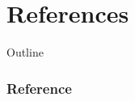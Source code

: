 \documentclass[12pt]{beamer}
\begin{document}
\section{References}
\begin{frame}[allowframebreaks]{Outline}
	\frametitle{Reference}
	
	
	\nocite{Perform}
	\nocite{DataMining}
	\nocite{FactoryOfTheFuture}
	\nocite{Harmonized}
	\nocite{Hybrid}
	\nocite{ModularProduction}
	\nocite{PlugProduce}
	\nocite{HighlyFlexible}
\end{frame}
\end{document}
